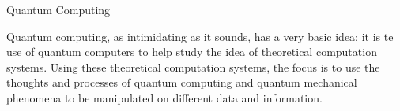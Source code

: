 \documentclass[11pt]{article}
\begin{document}
\begin{center}

Quantum Computing

\end{center}

\indent Quantum computing, as intimidating as it sounds, has a very basic idea; it is te use of quantum computers to help study the idea of theoretical computation systems. Using these theoretical computation systems, the focus is to use the thoughts and processes of quantum computing  and quantum mechanical phenomena to be manipulated on different data and information.
\end{document}
